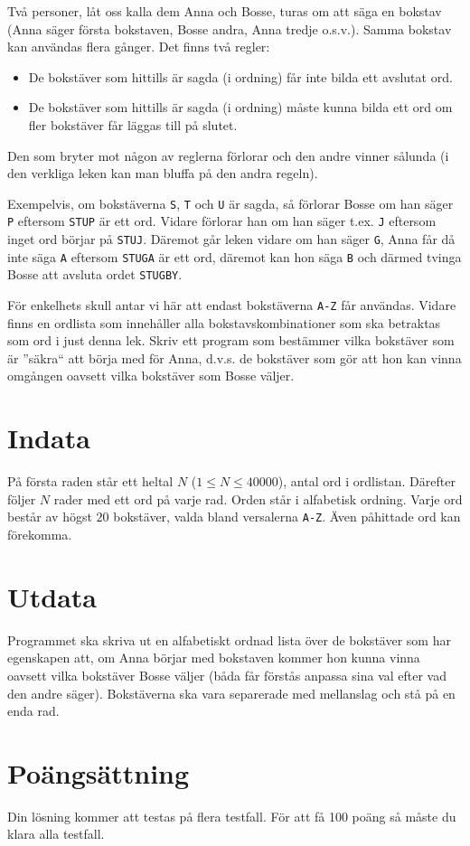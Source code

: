 Två personer, låt oss kalla dem Anna och Bosse, turas om att säga en bokstav (Anna säger första bokstaven, Bosse andra, Anna tredje o.s.v.). Samma bokstav kan användas flera gånger. Det finns två regler:

\begin{itemize}
	\item De bokstäver som hittills är sagda (i ordning) får inte bilda ett avslutat ord.
	\item De bokstäver som hittills är sagda (i ordning) måste kunna bilda ett ord om fler bokstäver får läggas till på slutet.
\end{itemize}

Den som bryter mot någon av reglerna förlorar och den andre vinner sålunda (i den verkliga leken kan man bluffa på den andra regeln).

Exempelvis, om bokstäverna \texttt{S}, \texttt{T} och \texttt{U} är sagda, så förlorar Bosse om han säger \texttt{P} eftersom \texttt{STUP} är ett ord. Vidare förlorar han om han säger t.ex. \texttt{J} eftersom inget ord börjar på \texttt{STUJ}. Däremot går leken vidare om han säger \texttt{G}, Anna får då inte säga \texttt{A} eftersom \texttt{STUGA} är ett ord, däremot kan hon säga \texttt{B} och därmed tvinga Bosse att avsluta ordet \texttt{STUGBY}.

För enkelhets skull antar vi här att endast bokstäverna \texttt{A-Z} får användas. Vidare finns en ordlista som innehåller alla bokstavskombinationer som ska betraktas som ord i just denna lek. Skriv ett program som bestämmer vilka bokstäver som är ''säkra`` att börja med för Anna, d.v.s. de bokstäver som gör att hon kan vinna omgången oavsett vilka bokstäver som Bosse väljer.

\section*{Indata}
På första raden står ett heltal $N$ ($1 \leq N \leq 40000$), antal ord i ordlistan. Därefter följer $N$ rader med ett ord på varje rad. Orden står i alfabetisk ordning. Varje ord består av högst $20$ bokstäver, valda bland versalerna \texttt{A-Z}. Även påhittade ord kan förekomma.

\section*{Utdata}
Programmet ska skriva ut en alfabetiskt ordnad lista över de bokstäver som har egenskapen att, om Anna börjar med bokstaven kommer hon kunna vinna oavsett vilka bokstäver Bosse väljer (båda får förstås anpassa sina val efter vad den andre säger). Bokstäverna ska vara separerade med mellanslag och stå på en enda rad.

\section*{Poängsättning}
Din lösning kommer att testas på flera testfall. För att få 100 poäng så måste du klara alla testfall.
